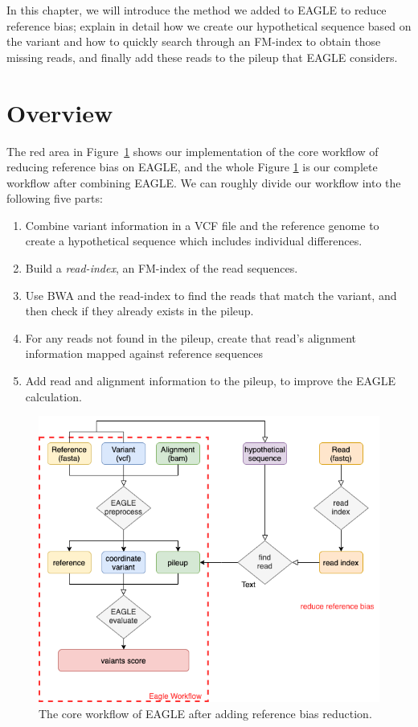 \hspace{24pt}
In this chapter, we will introduce the method we added to EAGLE to reduce reference bias; explain in detail how we create our hypothetical sequence based on the variant and how to quickly search through an FM-index to obtain those missing reads, and finally add these reads to the pileup that EAGLE considers.
\section{Overview}
The red area in Figure~\ref{f3-1} shows our implementation of the core workflow of reducing reference bias on EAGLE, and the whole Figure \ref{f3-1} is our complete workflow after combining EAGLE. 
We can roughly divide our workflow into the following five parts:

\begin{enumerate}
\item Combine variant information in a VCF file and the reference genome to create a hypothetical sequence which includes individual differences.
\item Build a \textit{read-index}, an FM-index of the read sequences.
\item Use BWA and the read-index to find the reads that match the variant, and then check if they already exists in the pileup.
\item For any reads not found in the pileup, create that read's alignment information mapped against reference sequences 
\item Add read and alignment information to the pileup, to improve the EAGLE calculation.
\end{enumerate}

\begin{figure}[H]
\includegraphics[width=0.8\columnwidth]{body/image/3-1.png}
\caption[Core workflow]{The core workflow of EAGLE after adding reference bias reduction.}
\label{f3-1}
\end{figure}

